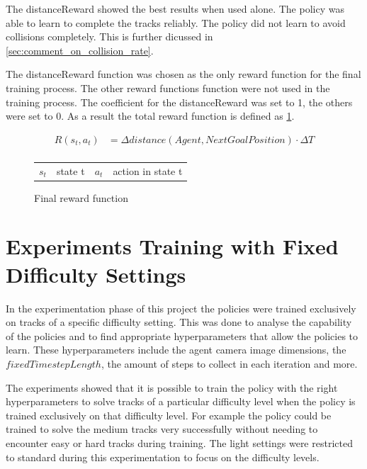 The distanceReward showed the best results when used alone. The policy was able to learn to complete the tracks reliably. The policy did not learn to avoid collisions completely. This is further dicussed in \ref{sec:comment_on_collision_rate}.

The distanceReward function was chosen as the only reward function for the final training process. The other reward functions function were not used in the training process.
The coefficient for the distanceReward was set to 1, the others were set to 0. As a result the total reward function is defined as \ref{fig:final_reward_function}.

\begin{figure}
    \centering
    \begin{align*}
        R(s_t,a_t) & = \Delta distance(Agent, NextGoalPosition) \cdot \Delta T \nonumber \\
    \end{align*}
    \caption{Final reward function}
    \begin{tabular}{r@{: }l r@{: }l}
        $s_t$ & state t & $a_t$ & action in state t
    \end{tabular}
    \label{fig:final_reward_function}
\end{figure}


\section{Experiments Training with Fixed Difficulty Settings}
\label{cha:experiment_fixed_difficulty}

In the experimentation phase of this project the policies were trained exclusively on tracks of a specific difficulty setting. This was done to analyse the capability of the policies and to find appropriate hyperparameters that allow the policies to learn. These hyperparameters include the agent camera image dimensions, the $fixedTimestepLength$, the amount of steps to collect in each iteration and more.

The experiments showed that it is possible to train the policy with the right hyperparameters to solve tracks of a particular difficulty level when the policy is trained exclusively on that difficulty level. For example the policy could be trained to solve the medium tracks very successfully without needing to encounter easy or hard tracks during training. The light settings were restricted to standard during this experimentation to focus on the difficulty levels.

